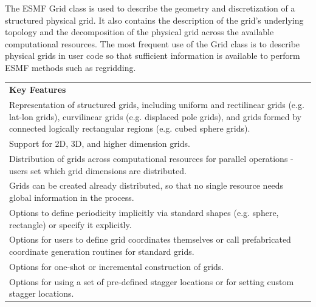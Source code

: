 %

The ESMF Grid class is used to describe the geometry and discretization
of a structured physical grid.  It also contains the description of the
grid's underlying topology and the decomposition of the physical grid
across the available computational resources.  The most frequent 
use of the Grid class is to describe physical grids in user
code so that sufficient information is available to perform ESMF
methods such as regridding. 

\begin{center}
\begin{tabular}{|p{6in}|}
\hline
\vspace{.01in}
{\bf Key Features} \\[.01in]
Representation of structured grids, including uniform and
rectilinear grids (e.g. lat-lon grids), curvilinear grids (e.g. displaced pole grids), 
and grids formed by connected logically rectangular regions (e.g. cubed
sphere grids).\\
Support for 2D, 3D, and higher dimension grids.\\ 
Distribution of grids across computational resources for parallel
operations - users set which grid dimensions are distributed.\\
Grids can be created already distributed, so that no single
resource needs global information in the process.\\
Options to define periodicity implicitly via standard shapes
(e.g. sphere, rectangle) or specify it explicitly.\\ 
Options for users to define grid coordinates themselves or call
prefabricated coordinate generation routines for standard grids.\\
Options for one-shot or incremental construction of grids.\\
Options for using a set of pre-defined stagger locations or for setting
custom stagger locations.\\[.03in] \hline
\end{tabular}
\end{center}

